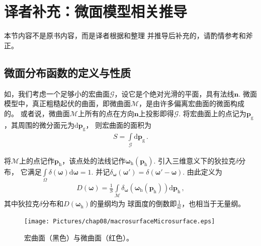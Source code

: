 \section{译者补充：微面模型相关推导}\label{sec:译者补充：微面模型相关推导}
\begin{remark}
    本节内容不是原书内容，而是译者根据\citet{heitz:hal-01024289}和\citet{10.5555/2383847.2383874}整理
    并推导后补充的，请酌情参考和斧正。
\end{remark}
\subsection{微面分布函数的定义与性质}\label{sub:微面分布函数的定义与性质}
如，我们考虑一个足够小的宏曲面$\mathcal{G}$，设它是个绝对光滑的平面，具有法线$\bm n$.
微面模型中，真正粗糙起伏的曲面，即微曲面$\mathcal{M}$，是由许多偏离宏曲面的微面构成的。
或者说，微曲面$\mathcal{M}$上所有的点在方向$\bm n$上投影即得$\mathcal{G}$.
将宏曲面上的点记为${\bm p}_{\mathrm{g}}$，其周围的微分面元为$\mathrm{d}{\bm p}_{\mathrm{g}}$，
则宏曲面的面积为
\begin{align}
    S=\int\limits_{\mathcal{G}}\mathrm{d}{\bm p}_{\mathrm{g}}\, .
\end{align}

将$\mathcal{M}$上的点记作${\bm p}_{\mathrm{h}}$，该点处的法线记作${\bm\omega}_{\mathrm{h}}({\bm p}_{\mathrm{h}})$.
引入三维意义下的狄拉克$\delta$分布，
它满足$\displaystyle\int\limits_{\varOmega}\delta({\bm\omega})\mathrm{d}{\bm\omega}=1$.
并记$\delta_{\bm\omega}({\bm\omega}')=\delta({\bm\omega}'-{\bm\omega})$.
由此定义为
\begin{align}\label{eq:08ex01-MicrosurfaceDistribution}
    D({\bm\omega})=\displaystyle\frac{1}{S}\int\limits_{\mathcal{M}}
    \delta_{\bm\omega}({\bm\omega}_{\mathrm{h}}({\bm p}_{\mathrm{h}}))
    \mathrm{d}{\bm p}_{\mathrm{h}}\, ,
\end{align}
其中狄拉克$\delta$分布和$D({\bm\omega}_{\mathrm{h}})$的量纲均为
球面度的倒数即$\displaystyle\frac{1}{\text{sr}}$，也相当于无量纲。

\begin{figure}[htbp]
    \centering
    \texttt{[image: Pictures/chap08/macrosurfaceMicrosurface.eps]}
    \caption{宏曲面（黑色）与微曲面（红色）。}
    \label{fig:08ex01-macrosurfaceMicrosurface}
\end{figure}

